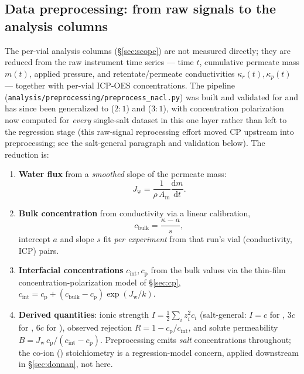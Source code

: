 \documentclass[11pt]{article}
\newcommand{\Jw}{J_{\mathrm{w}}}
\newcommand{\cint}{c_{\mathrm{int}}}
\newcommand{\cp}{c_{\mathrm{p}}}
\begin{document}
\subsection{Data preprocessing: from raw signals to the analysis columns}\label{sec:preproc}
The per-vial analysis columns (\S\ref{sec:scope}) are not measured directly; they
are reduced from the raw instrument time series --- time $t$, cumulative permeate
mass $m(t)$, applied pressure, and retentate/permeate conductivities
$\kappa_r(t),\kappa_p(t)$ --- together with per-vial ICP-OES concentrations. The
pipeline (\texttt{analysis/preprocessing/preprocess\_nacl.py}) was built and
validated for  and has since been generalized to  ($2{:}1$)
and  ($3{:}1$), with concentration polarization now computed for
\emph{every} single-salt dataset in this one layer rather than left to the
regression stage (this raw-signal reprocessing effort moved CP upstream into
preprocessing; see the salt-general paragraph and validation below). The
reduction is:
\begin{enumerate}[itemsep=2pt]
  \item \textbf{Water flux} from a \emph{smoothed} slope of the permeate mass:
    \begin{equation}
      \Jw = \frac{1}{\rho\,A_{\mathrm m}}\frac{\mathrm d m}{\mathrm d t}.
      \label{eq:jw-preproc}
    \end{equation}
  \item \textbf{Bulk concentration} from conductivity via a linear calibration,
    \begin{equation}
      c_{\mathrm{bulk}} = \frac{\kappa - a}{s},
      \label{eq:calib}
    \end{equation}
    intercept $a$ and slope $s$ fit \emph{per experiment} from that run's vial
    (conductivity, ICP) pairs.
  \item \textbf{Interfacial concentrations} $\cint,\cp$ from the bulk values via the
    thin-film concentration-polarization model of \S\ref{sec:cp},
    $\cint = \cp + (c_{\mathrm{bulk}}-\cp)\exp(\Jw/k)$.
  \item \textbf{Derived quantities}: ionic strength $I=\tfrac12\sum_i z_i^2 c_i$
    (salt-general: $I=c$ for , $3c$ for , $6c$ for
    ), observed rejection $R = 1 - \cp/\cint$, and solute
    permeability $B = \Jw\,\cp/(\cint-\cp)$. Preprocessing emits \emph{salt}
    concentrations throughout; the co-ion () stoichiometry is a
    regression-model concern, applied downstream in \S\ref{sec:donnan}, not
    here.
\end{enumerate}
\end{document}
